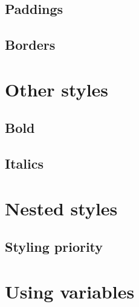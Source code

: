 \subsection{Paddings}

\subsection{Borders}

\section{Other styles}

\subsection{Bold}

\subsection{Italics}

\section{Nested styles}

\subsection{Styling priority}

\section{Using variables}